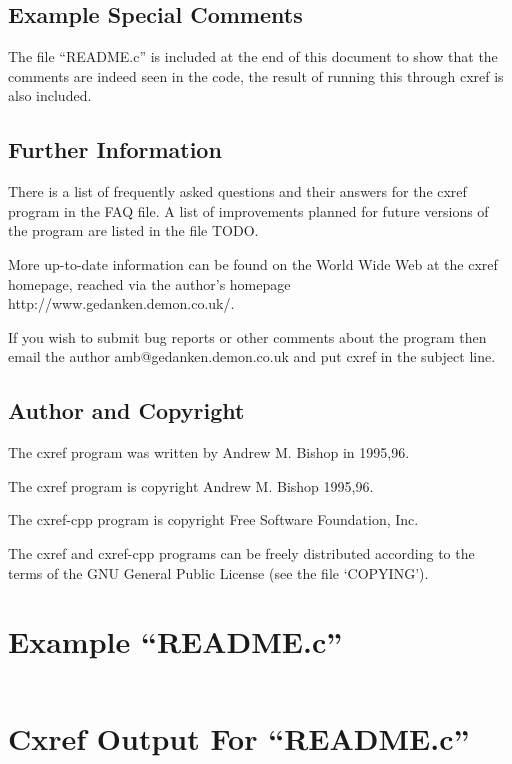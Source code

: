 \section{Example Special Comments}

The file ``README.c'' is included at the end of this document to show that the
comments are indeed seen in the code, the result of running this through cxref
is also included.

\section{Further Information}

There is a list of frequently asked questions and their answers for the cxref
program in the FAQ file.  A list of improvements planned for future versions of
the program are listed in the file TODO.

More up-to-date information can be found on the World Wide Web at the cxref
homepage, reached via the author's homepage http://www.gedanken.demon.co.uk/.

If you wish to submit bug reports or other comments about the program then email
the author amb@gedanken.demon.co.uk and put cxref in the subject line.

\section{Author and Copyright}

The cxref program was written by Andrew M. Bishop in 1995,96.

The cxref program is copyright Andrew M. Bishop 1995,96.

The cxref-cpp program is copyright Free Software Foundation, Inc.

The cxref and cxref-cpp programs can be freely distributed according to the
terms of the GNU General Public License (see the file `COPYING').

\chapter{Example ``README.c''}


\def\endverbatim{\endtrivlist}
\begin{verbatim}
\end{verbatim}

\chapter{Cxref Output For ``README.c''}







\tableofcontents


